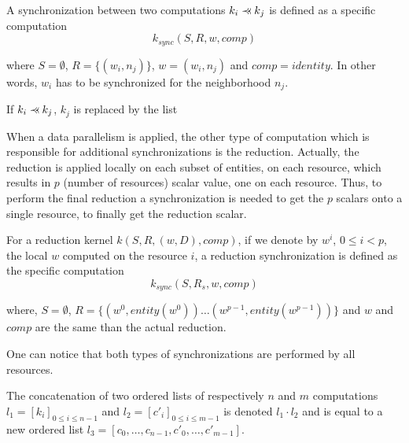 \begin{mydef}
A synchronization between two computations $k_i \pprec k_j$ is defined as a specific computation 
\begin{equation*}
k_{sync}(S,R,w,comp)
\end{equation*}
\end{mydef}
where $S=\emptyset$, $R=\{(w_i,n_j)\}$, $w=(w_i,n_j)$ and $comp=identity$. In other words, $w_i$ has to be synchronized for the neighborhood $n_j$.

\begin{mydef}
If $k_i \pprec k_j$, $k_j$ is replaced by the list
\begin{equation*}
[k_{sync}(\emptyset,\{(w_i,n_j)\},(w_i,n_j),identity), k_j]
\end{equation*}
\end{mydef}

When a data parallelism is applied, the other type of computation which is responsible for additional synchronizations is the reduction. Actually, the reduction is applied locally on each subset of entities, on each resource, which results in $p$ (number of resources) scalar value, one on each resource. Thus, to perform the final reduction a synchronization is needed to get the $p$ scalars onto a single resource, to finally get the reduction scalar.

\begin{mydef}
For a reduction kernel $k(S,R,(w,D),comp)$, if we denote by $w^i$, $0 \leq i<p$, the local $w$ computed on the resource $i$, a reduction synchronization is defined as the specific computation 
\begin{equation*}
k_{sync}(S,R_s,w,comp)
\end{equation*}
\end{mydef}
where, $S=\emptyset$, $R=\{(w^0,entity(w^0)) \dots (w^{p-1},entity(w^{p-1}))\}$ and $w$ and $comp$ are the same than the actual reduction.

One can notice that both types of synchronizations are performed by all resources.

\begin{mydef}
The concatenation of two ordered lists of respectively $n$ and $m$ computations $l_1=[k_i]_{0 \leq i \leq n-1}$ and $l_2=[c'_i]_{0 \leq i \leq m-1}$ is denoted $l_1 \cdot l_2$ and is equal to a new ordered list $l_3=[c_0,\dots,c_{n-1},c'_0,\dots,c'_{m-1}]$.
\end{mydef}

